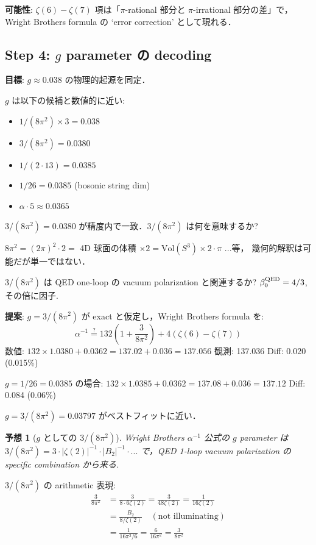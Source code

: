 \documentclass[11pt,a4paper]{article}
\newtheorem{conjecture}{予想}
\begin{document}
\textbf{可能性}: $\zeta(6) - \zeta(7)$ 項は「$\pi$-rational 部分と
$\pi$-irrational 部分の差」で，Wright Brothers formula の
`error correction' として現れる．

\subsection{Step 4: $g$ parameter の decoding}

\textbf{目標}: $g \approx 0.038$ の物理的起源を同定．

$g$ は以下の候補と数値的に近い:
\begin{itemize}
\item $1/(8\pi^2) \times 3 = 0.038$
\item $3/(8\pi^2) = 0.0380$
\item $1/(2 \cdot 13) = 0.0385$
\item $1/26 = 0.0385$ (bosonic string dim)
\item $\alpha \cdot 5 \approx 0.0365$
\end{itemize}

$3/(8\pi^2) = 0.0380$ が精度内で一致．$3/(8\pi^2)$ は何を意味するか?

$8\pi^2 = (2\pi)^2 \cdot 2 = $ 4D 球面の体積 $\times 2 = \text{Vol}(S^3) \times 2 \cdot \pi$ ...等，
幾何的解釈は可能だが単一ではない．

$3/(8\pi^2)$ は QED one-loop の vacuum polarization と関連するか?
$\beta_0^{\rm QED} = 4/3$, その倍に因子.

\textbf{提案}: $g = 3/(8\pi^2)$ が exact と仮定し，Wright Brothers formula を:
\begin{equation}
\alpha^{-1} \stackrel{?}{=} 132 \left(1 + \frac{3}{8\pi^2}\right) + 4(\zeta(6) - \zeta(7))
\end{equation}
数値: $132 \times 1.0380 + 0.0362 = 137.02 + 0.036 = 137.056$
観測: 137.036
Diff: 0.020 (0.015\%)

$g = 1/26 = 0.0385$ の場合:
$132 \times 1.0385 + 0.0362 = 137.08 + 0.036 = 137.12$
Diff: 0.084 (0.06\%)

$g = 3/(8\pi^2) = 0.03797$ がベストフィットに近い．

\begin{conjecture}[$g$ としての $3/(8\pi^2)$]
Wright Brothers $\alpha^{-1}$ 公式の $g$ parameter は
$3/(8\pi^2) = 3 \cdot |\zeta(2)|^{-1} \cdot |B_2|^{-1} \cdot ... $
で，QED 1-loop vacuum polarization の specific combination から来る.
\end{conjecture}

$3/(8\pi^2)$ の arithmetic 表現:
\begin{align}
\frac{3}{8\pi^2} &= \frac{3}{8 \cdot 6 \zeta(2)} = \frac{3}{48 \zeta(2)}
= \frac{1}{16 \zeta(2)}\\
&= \frac{B_2}{8/\zeta(2)} \quad (\text{not illuminating})\\
&= \frac{1}{16 \pi^2/6} = \frac{6}{16\pi^2} = \frac{3}{8\pi^2}
\end{align}
\end{document}
